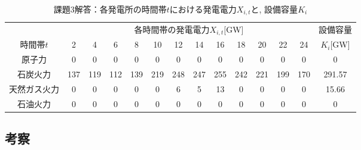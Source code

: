 \documentclass[]{jsarticle}
\begin{document}
      \begin{table}[htb]
        \begin{center}
          \caption{課題3解答：各発電所の時間帯$t$における発電電力$X_{i,t}$と, 設備容量$K_i$}
          \begin{tabular}{|c||c|c|c|c|c|c|c|c|c|c|c|c||c|} \hline
            \multicolumn{1}{|c||}{} & \multicolumn{12}{|c||}{各時間帯の発電電力$X_{i,t}$[GW]} & \multicolumn{1}{|c|}{設備容量} \\ \cline{1-13}
            時間帯$t$ & 2 & 4 & 6 & 8 & 10 & 12 & 14 & 16 & 18 & 20 & 22 & 24 & $K_i$[GW]\\ \hline \hline
            原子力 & 0 & 0 & 0 & 0 & 0 & 0 & 0 & 0 & 0 & 0 & 0 & 0 & 0\\ \hline
            石炭火力 & 137 & 119 & 112 & 139 & 219 & 248 & 247 & 255 & 242 & 221 & 199 & 170 & 291.57\\ \hline
            天然ガス火力 & 0 & 0 & 0 & 0 & 0 & 6 & 5 & 13 & 0 & 0 & 0 & 0 & 15.66 \\ \hline
            石油火力 & 0 & 0 & 0 & 0 & 0 & 0 & 0 & 0 & 0 & 0 & 0 & 0 & 0\\ \hline
          \end{tabular}
          \label{ans3}
        \end{center}
      \end{table}


  \subsection{考察}

\end{document}

